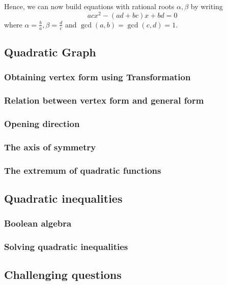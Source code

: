 \documentclass[12pt]{article}
\begin{document}
    Hence, we can now build equations with rational roots $\alpha,\beta$ by writing \[acx^2-(ad+bc)x+bd=0\] where $\alpha=\frac{b}{a}, \beta=\frac{d}{c}$ and $\gcd(a,b)=\gcd(c,d)=1$.

    \subsection{Quadratic Graph}

    \subsubsection*{Obtaining vertex form using Transformation}

    \subsubsection*{Relation between vertex form and general form}

    \subsubsection*{Opening direction}

    \subsubsection*{The axis of symmetry}

    \subsubsection*{The extremum of quadratic functions}

    \subsection{Quadratic inequalities}

    \subsubsection*{Boolean algebra}

    \subsubsection*{Solving quadratic inequalities}

    \subsection{Challenging questions}
\end{document}
